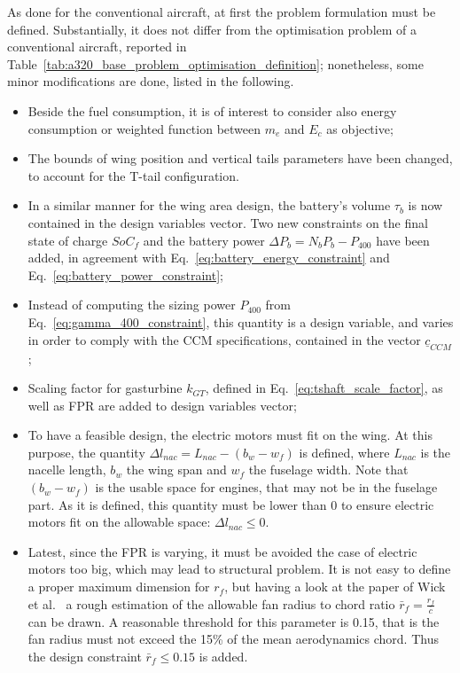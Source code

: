 As done for the conventional aircraft, at first the problem formulation must be defined.
Substantially, it does not differ from the optimisation problem of a conventional aircraft, reported in Table~\ref{tab:a320_base_problem_optimisation_definition}; nonetheless, some minor modifications are done, listed in the following. 
\begin{itemize}
	\item Beside the fuel consumption, it is of interest to consider also energy consumption or weighted function between $m_e$ and $E_c$ as objective; 
	
	\item The bounds of wing position and vertical tails parameters have been changed, to account for the T-tail configuration.
	
	\item In a similar manner for the wing area design, the battery's volume $\tau_{b}$ is now contained in the design variables vector. 
	Two new constraints on the final state of charge $SoC_f$ and the battery power $\Delta P_b=N_bP_b-P_{400}$ have been added, in agreement with Eq.~\eqref{eq:battery_energy_constraint} and Eq.~\eqref{eq:battery_power_constraint}; 
	
	\item Instead of computing the sizing power $P_{400}$ from Eq.~\eqref{eq:gamma_400_constraint}, this quantity is a design variable, and varies in order to comply with the CCM specifications, contained in the vector $\underline{c}_{CCM}$;
	
	\item Scaling factor for gasturbine $k_{GT}$, defined in Eq.~\eqref{eq:tshaft_scale_factor}, as well as FPR are added to design variables vector;
	
	\item To have a feasible design, the electric motors must fit on the wing. 
	At this purpose, the quantity $\Delta l_{nac}=L_{nac}-(b_w-w_f)$ is defined, where $L_{nac}$ is the nacelle length, $b_w$ the wing span and $w_f$ the fuselage width. 
	Note that $(b_w-w_f)$ is the usable space for engines, that may not be in the fuselage part. 
	As it is defined, this quantity must be lower than 0 to ensure electric motors fit on the allowable space: $\Delta l_{nac}\leq 0$. 
	
	\item Latest, since the FPR is varying, it must be avoided the case of electric motors too big, which may lead to structural problem. 
	It is not easy to define a proper maximum dimension for $r_f$, but having a look at the paper of Wick et al.~\cite{bib:wick} a rough estimation of the allowable fan radius to chord ratio $\bar{r}_f=\frac{r_f}{\bar{c}}$ can be drawn. 
	A reasonable threshold for this parameter is 0.15, that is the fan radius must not exceed the 15\% of the mean aerodynamics chord. 
	Thus the design constraint $\bar{r}_f \leq 0.15$ is added.
\end{itemize}

